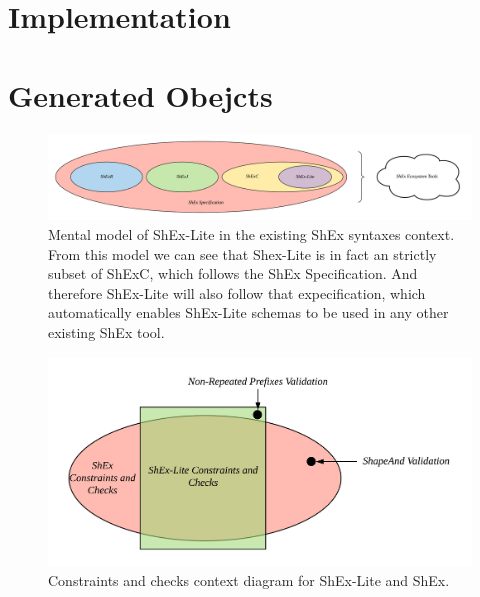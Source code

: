 \section{Implementation}

\section{Generated Obejcts}

\begin{figure}
    \includegraphics[width=\textwidth]{images/shex-lite-syntaxes-mental-model.png}
    \centering
    \caption[Mental model of ShEx-Lite in the existing ShEx syntaxes context.]{Mental model of
    ShEx-Lite in the existing ShEx syntaxes context. From this model we can see that Shex-Lite
    is in fact an strictly subset of ShExC, which follows the ShEx Specification. And therefore
    ShEx-Lite will also follow that expecification, which automatically enables ShEx-Lite schemas
    to be used in any other existing ShEx tool.}
    \label{fig:syntax-mental-model}
\end{figure}

\begin{figure}
  \includegraphics[width=\textwidth]{images/shex-lite-constraints-context.png}
  \centering
  \caption[Constraints and checks context diagram for ShEx-Lite and ShEx.]{Constraints
  and checks context diagram for ShEx-Lite and ShEx.}
  \label{fig:constraints-context}
\end{figure}

